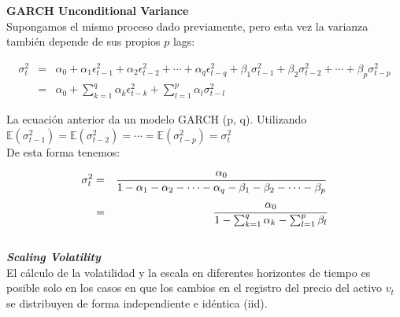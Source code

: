	

	
\pagebreak\textbf{GARCH Unconditional Variance}\\
	
	Supongamos el mismo proceso dado previamente, pero esta vez la varianza
	tambi\'en depende de sus propios $p$ lags:
	
	\begin{eqnarray}
	\sigma_{t}^{2} & = & \alpha_{0}+\alpha_{1}\epsilon_{t-1}^{2}+\alpha_{2}\epsilon_{t-2}^{2}+\cdots+\alpha_{q}\epsilon_{t-q}^{2}+\beta_{1}\sigma_{t-1}^{2}+\beta_{2}\sigma_{t-2}^{2}+\cdots+\beta_{p}\sigma_{t-p}^{2}\nonumber \\
	& = & \alpha_{0}+\sum_{k=1}^{q}\alpha_{k}\epsilon_{t-k}^{2}+\sum_{l=1}^{p}\alpha_{l}\sigma_{t-l}^{2}
	\end{eqnarray}
	
	
	La ecuación anterior da un modelo GARCH (p, q). Utilizando\\
	
	$\mathbb{E}\left(\sigma_{t-1}^{2}\right)=\mathbb{E}\left(\sigma_{t-2}^{2}\right)=\cdots=\mathbb{E}\left(\sigma_{t-p}^{2}\right)=\sigma_{t}^{2}$\\
	
	
	De esta forma tenemos: 
	
	\begin{eqnarray}
	\sigma_{t}^{2} & = & \frac{\alpha_{0}}{1-\alpha_{1}-\alpha_{2}-\cdots-\alpha_{q}-\beta_{1}-\beta_{2}-\cdots-\beta_{p}}\nonumber \\
	& = & \cfrac{\alpha_{0}}{1-\sum_{k=1}^{q}\alpha_{k}-\sum_{l=1}^{p}\beta_{l}}
	\end{eqnarray}
	\\

	
\textit{\textbf{Scaling Volatility}}\\
	El c\'alculo de la volatilidad y la escala en diferentes horizontes de tiempo es
	posible solo en los casos en que los cambios en el registro del precio del activo $v_ {t}$ se distribuyen de forma independiente e idéntica (iid).
	
